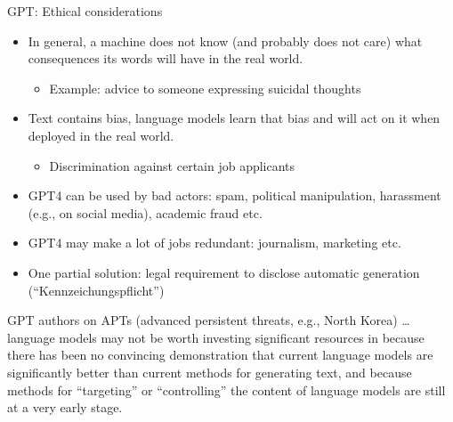 \begin{frame}{GPT: Ethical considerations}

\vfill

  \begin{itemize}
\item In general, a machine does not know (and
probably does not care) what consequences its words will have
in the real world.
  \begin{itemize}
\item Example: advice to someone expressing suicidal thoughts
    \end{itemize}
\item Text contains bias, language models learn that
bias and will act on it when deployed in the real world.
  \begin{itemize}
\item Discrimination against certain job applicants
    \end{itemize}
\item GPT4 can be
used by bad actors: spam, political manipulation, harassment
(e.g., on social media), academic fraud etc.
\item GPT4 may make a
lot of jobs redundant: journalism, marketing etc.
\item One partial solution: legal requirement to
disclose automatic generation (``Kennzeichungspflicht'')
    \end{itemize}

\vfill

\end{frame}


\begin{vbframe}{}

\vfill

  \begin{block}{GPT authors on APTs (advanced persistent
      threats, e.g., North Korea)}
\ldots language models may not be worth investing significant
resources in because there has been no convincing
demonstration that current language models are significantly
better than current methods for generating text, and because
methods for
``targeting'' or ``controlling'' the content of language models
are still at a very early stage.
    \end{block}

\vfill

\end{vbframe}

